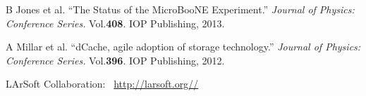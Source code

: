 \documentclass[a4paper]{jpconf}
\begin{document}
\begin{thebibliography}{9}

B Jones et al.  ``The Status of the MicroBooNE Experiment.''  \textit{Journal of Physics: Conference Series.} Vol.\textbf{408}. IOP Publishing, 2013.


A Millar et al.  ``dCache, agile adoption of storage technology.''  \textit{Journal of Physics: Conference Series.} Vol.\textbf{396}. IOP Publishing, 2012.

{LArSoft Collaboration}:~
\url{http://larsoft.org//}

\end{thebibliography}
\end{document}
